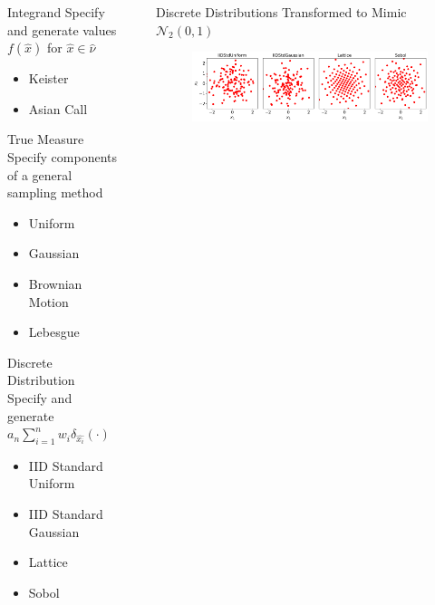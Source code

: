 \documentclass[final]{beamer}
\newcommand{\bfCenter}[1]{\centerline{\textbf{#1}}}
\newlength{\sepwid}
\newlength{\onecolwid}
\newlength{\twocolwid}
\begin{document}
\begin{frame}[t]
\begin{columns}[t]
\begin{column}{\onecolwid}
\vspace{-.1in}
\begin{alertblock}{Integrand}
    Specify and generate values $f(\hat{x})$ for $\hat{x} \in \hat{\nu}$
    \begin{itemize}
        \item Keister
        \item Asian Call
    \end{itemize}
\end{alertblock}

\vspace{-.1in}
\begin{alertblock}{True Measure}
    Specify components of a general sampling method
    \begin{itemize}
        \item Uniform
        \item Gaussian
        \item Brownian Motion 
        \item Lebesgue
    \end{itemize}
\end{alertblock}

\vspace{-.1in}
\begin{alertblock}{Discrete Distribution}
    Specify and generate $a_n \sum_{i=1}^n w_i \delta_{\hat{x_i}}(\cdot)$
    \begin{itemize}
        \item IID Standard Uniform
        \item IID Standard Gaussian
        \item Lattice
        \item Sobol
    \end{itemize}
\end{alertblock}

\end{column}


\begin{column}{\sepwid}\end{column}
\begin{column}{\twocolwid}\vspace{-.25in}

\begin{block}{Discrete Distributions Transformed to Mimic $\mathcal{N}_2(0,1)$}
    \begin{figure}
        \includegraphics[width=1\textwidth]{Images/Gaussian_tm_transform.png}
    \end{figure}
    \bfCenter{}
\end{block}


\end{column}
\end{columns}
\end{frame}
\end{document}
